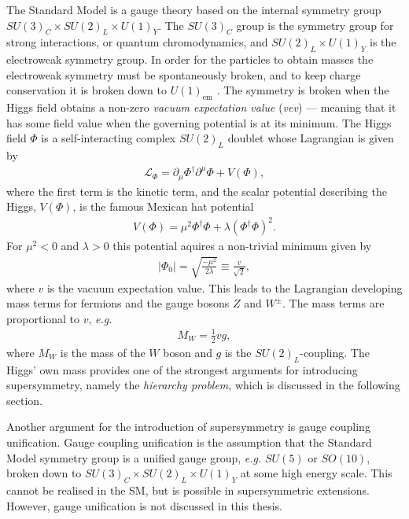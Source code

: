\documentclass[twoside,english]{uiofysmaster}
\begin{document}
The Standard Model is a gauge theory based on the internal symmetry group $SU(3)_C \times SU(2)_L \times U(1)_Y$. The $SU(3)_C$  group is the symmetry group for strong interactions, or quantum chromodynamics, and $SU(2)_L \times U(1)_Y$  is the electroweak symmetry group. In order for the particles to obtain masses the electroweak symmetry must be spontaneously broken, and to keep charge conservation it is broken down to $U(1)_{\mathrm{em}}$ . The symmetry is broken when the Higgs field obtains a non-zero \textit{vacuum expectation value} (\textit{vev}) --- meaning that it has some field value when the governing potential is at its minimum. The Higgs field $\Phi$ is a self-interacting complex $SU(2)_L$ doublet whose Lagrangian is given by
\begin{align}
\mathcal{L}_{\Phi} = \partial_{\mu} \Phi^{\dagger} \partial^{\mu} \Phi + V(\Phi),
\end{align}
where the first term is the kinetic term, and the scalar potential describing the Higgs, $V(\Phi)$, is the famous Mexican hat potential
\begin{align}
V(\Phi) = \mu^2 \Phi^{\dagger} \Phi + \lambda (\Phi^{\dagger} \Phi)^2.
\end{align}
For $\mu^2 < 0$ and $\lambda > 0$ this potential aquires a non-trivial minimum given by
\begin{align}
|\Phi_0| = \sqrt{\frac{-\mu^2}{2\lambda}} \equiv \frac{v}{\sqrt{2}},
\end{align}
where $v$ is the vacuum expectation value. This leads to the Lagrangian developing mass terms for fermions and the gauge bosons $Z$ and $W^{\pm}$. The mass terms are proportional to $v$, \textit{e.g.}
\begin{align*}
M_W = \frac{1}{2} v g,
\end{align*}
where $M_W$  is the mass of the $W$ boson and $g$ is the $SU(2)_L$-coupling. The Higgs' own mass provides one of the strongest arguments for introducing supersymmetry, namely the \textit{hierarchy problem}, which is discussed in the following section. 

Another argument for the introduction of supersymmetry is gauge coupling unification. Gauge coupling unification is the assumption that the Standard Model symmetry group is a unified gauge group, \textit{e.g.} $SU(5)$ or $SO(10)$, broken down to $SU(3)_C \times SU(2)_L \times U(1)_Y$ at some high energy scale. This cannot be realised in the SM, but is possible in supersymmetric extensions. However, gauge unification is not discussed in this thesis.
\end{document}
